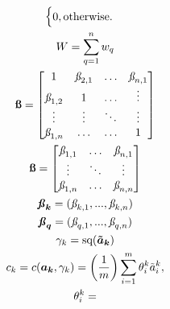 \documentclass{article}
\begin{document}
\begin{gather}
\begin{cases}
        0, \text{otherwise.}
    \end{cases}\\
    W = 
        \sum_{q=1}^{n}{
            w_q
        }\\
    \textbf{\ss} = 
    \begin{bmatrix}
        1 & \textit{\ss}_{2,1} & \hdots & \textit{\ss}_{n,1}\\
        \textit{\ss}_{1,2} & 1 & \hdots & \vdots\\
        \vdots & \vdots & \ddots & \vdots\\
        \textit{\ss}_{1,n} & \hdots & \hdots & 1\\
    \end{bmatrix}\\
    \textbf{\ss} = 
    \begin{bmatrix}
        \textit{\ss}_{1,1} & \hdots & \textit{\ss}_{n,1}\\
        \vdots & \ddots & \vdots\\
        \textit{\ss}_{1,n} & \hdots & \textit{\ss}_{n,n}\\
    \end{bmatrix}\\
    \boldsymbol{\textbf{\textit{\ss}}_{k}} = (\textit{\ss}_{k,1}, ..., \textit{\ss}_{k,n})\\
    \boldsymbol{\textbf{\textit{\ss}}_{q}} = (\textit{\ss}_{q,1}, ..., \textit{\ss}_{q,n})\\
    \gamma_{k} = 
        \text{sq}(\boldsymbol{\tilde{a}_k})\\
    c_{k} = 
    c(\boldsymbol{a_k}, \gamma_{k}) = 
        \left( \frac{1}{m} \right)
        \sum_{i=1}^{m}{
            \theta_{i}^{k}
            \tilde{a}_{i}^{k}
            },\\
    \theta_{i}^{k} =

\end{gather}
\end{document}
